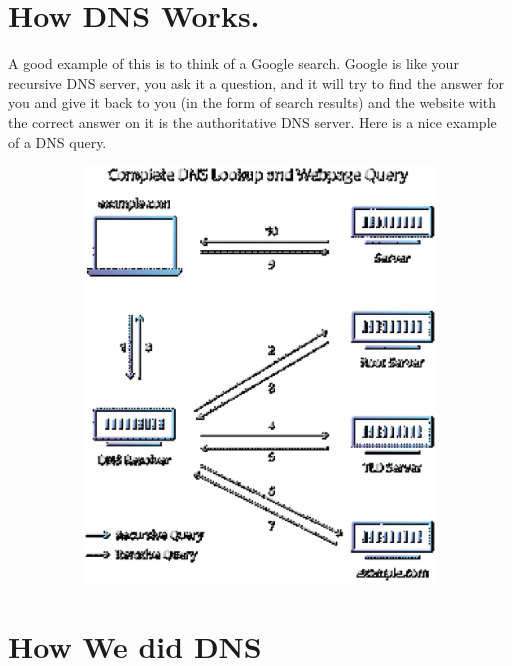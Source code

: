 \documentclass{article} %
\begin{document}
\noindent 

\noindent 
\section{How DNS Works.}

\noindent 

\noindent  A good example of this is to think of a Google search. Google is like your recursive DNS server, you ask it a question, and it will try to find the answer for you and give it back to you (in the form of search results) and the website with the correct answer on it is the authoritative DNS server. Here is a nice example of a DNS query. 

\noindent 

\noindent \includegraphics*[width=6.52in, height=4.34in, keepaspectratio=false]{image1}

\noindent 

\noindent 
\section{How We did DNS }

\noindent 
\end{document}
